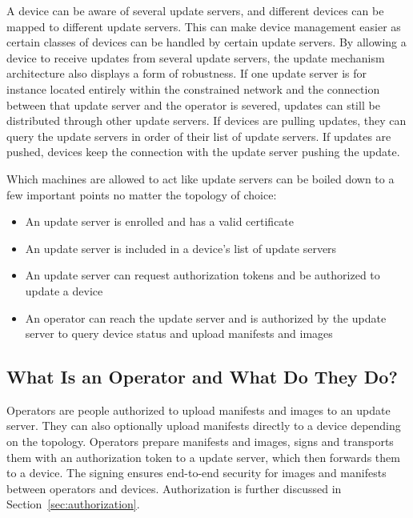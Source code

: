 \documentclass[0-thesis.tex]{subfiles}
\begin{document}
A device can be aware of several update servers, and different devices can be mapped to
different update servers. This can make device management easier as certain classes of
devices can be handled by certain update servers. By allowing a device to receive updates
from several update servers, the update mechanism architecture also displays a form of
robustness. If one update server is for instance located entirely within the constrained
network and the connection between that update server and the operator is severed, updates
can still be distributed through other update servers. If devices are pulling updates,
they can query the update servers in order of their list of update servers. If updates are
pushed, devices keep the connection with the update server pushing the update.

Which machines are allowed to act like update servers can be boiled down to a few important
points no matter the topology of choice:

\begin{itemize}
    \item An update server is enrolled and has a valid certificate
    \item An update server is included in a device's list of update servers
    \item An update server can request authorization tokens and be authorized to update a
            device
    \item An operator can reach the update server and is authorized by the update server
            to query device status and upload manifests and images
\end{itemize}

\subsection{What Is an Operator and What Do They Do?}
\label{ssec:what-is-an-operator}
Operators are people authorized to upload manifests and images to an update server. They
can also optionally upload manifests directly to a device depending on the topology.
Operators prepare manifests and images, signs and transports them with an authorization
token to a update server, which then forwards them to a device. The signing ensures
end-to-end security for images and manifests between operators and devices. Authorization
is further discussed in Section~\ref{sec:authorization}.
\end{document}
